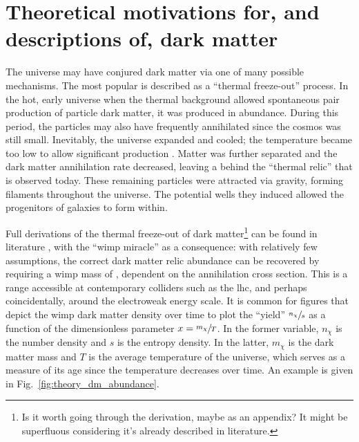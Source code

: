 

\section{Theoretical motivations for, and descriptions of, dark matter}
\label{sec:theory_dark_matter}


The universe may have conjured dark matter via one of many possible mechanisms. The most popular is described as a ``thermal freeze-out'' process. In the hot, early universe when the thermal background allowed spontaneous pair production of particle dark matter, it was produced in abundance. During this period, the particles may also have frequently annihilated since the cosmos was still small. Inevitably, the universe expanded and cooled; the temperature became too low to allow significant production \cite{Baldes:2017gzw}. Matter was further separated and the dark matter annihilation rate decreased, leaving a behind the ``thermal relic'' that is observed today. These remaining particles were attracted via gravity, forming filaments throughout the universe. The potential wells they induced allowed the progenitors of galaxies to form within.

Full derivations of the thermal freeze-out of dark matter\footnote{Is it worth going through the derivation, maybe as an appendix? It might be superfluous considering it's already described in literature.} can be found in literature \cite{cosmic_abundances_stable_particles,Bender:2012gc}, with the ``\acrshort{wimp} miracle'' as a consequence: with relatively few assumptions, the correct dark matter relic abundance can be recovered by requiring a \acrshort{wimp} mass of \OrderOf{\text{\tGeV} - \text{\tTeV}}, dependent on the annihilation cross section. This is a range accessible at contemporary colliders such as the \acrshort{lhc}, and perhaps coincidentally, around the electroweak energy scale. It is common for figures that depict the \acrshort{wimp} dark matter density over time to plot the ``yield'' $\sfrac{n_{\chi}}{s}$ as a function of the dimensionless parameter $x = \sfrac{m_{\chi}}{T}$. In the former variable, $n_{\chi}$ is the number density and $s$ is the entropy density. In the latter, $m_{\chi}$ is the dark matter mass and $T$ is the average temperature of the universe, which serves as a measure of its age since the temperature decreases over time. An example is given in Fig.~\ref{fig:theory_dm_abundance}.

